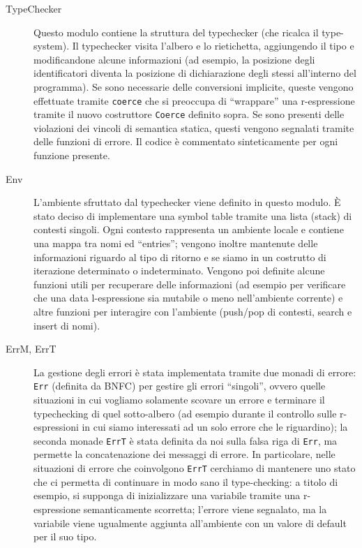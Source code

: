 \documentclass{report}
\newcommand{\term}[1]{\texttt{#1}}
\begin{document}
\begin{description}

    \item[TypeChecker] Questo modulo contiene la struttura del typechecker (che ricalca il type-system). Il typechecker visita l'albero e lo rietichetta, aggiungendo il tipo e modificandone alcune informazioni (ad esempio, la posizione
        degli identificatori diventa la posizione di dichiarazione degli stessi all'interno del programma). Se sono necessarie delle
        conversioni implicite, queste vengono effettuate tramite \term{coerce} che si preoccupa di ``wrappare'' una r-espressione tramite
        il nuovo costruttore \term{Coerce} definito sopra. Se sono presenti delle violazioni dei vincoli di semantica statica, questi vengono
        segnalati tramite delle funzioni di errore. Il codice è commentato sinteticamente per ogni funzione presente.

    \item[Env] L'ambiente sfruttato dal typechecker viene definito in questo modulo. È stato deciso di implementare una symbol table
        tramite una lista (stack) di contesti singoli. Ogni contesto rappresenta un ambiente locale e contiene una mappa tra nomi ed ``entries'';
        vengono inoltre mantenute delle informazioni riguardo al tipo di ritorno e se siamo in un costrutto di iterazione determinato o indeterminato.
        Vengono poi definite alcune funzioni utili per recuperare delle informazioni (ad esempio per verificare che una data l-espressione
        sia mutabile o meno nell'ambiente corrente) e altre funzioni per interagire con l'ambiente (push/pop di contesti, search e insert
        di nomi).

    \item[ErrM, ErrT] La gestione degli errori è stata implementata tramite due monadi di errore: \term{Err} (definita da BNFC) per gestire gli errori ``singoli'',
        ovvero quelle situazioni in cui vogliamo solamente scovare un errore e terminare il typechecking di quel sotto-albero (ad esempio durante
        il controllo sulle r-espressioni in cui siamo interessati ad un solo errore che le riguardino); la seconda monade \term{ErrT} è stata
        definita da noi sulla falsa riga di \term{Err}, ma permette la concatenazione dei messaggi di errore. In particolare, nelle situazioni
        di errore che coinvolgono \term{ErrT} cerchiamo di mantenere uno stato che ci permetta di continuare in modo sano il type-checking:
        a titolo di esempio, si supponga di inizializzare una variabile tramite una r-espressione semanticamente scorretta; l'errore viene
        segnalato, ma la variabile viene ugualmente aggiunta all'ambiente con un valore di default per il suo tipo.


\end{description}
\end{document}
